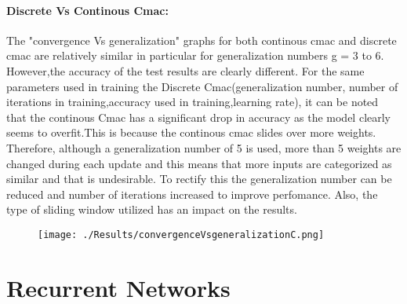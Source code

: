 \documentclass{article}
\begin{document}
  \paragraph{Discrete Vs Continous Cmac:}
  The "convergence Vs generalization" graphs for both continous cmac and discrete cmac are relatively similar in particular for generalization numbers g = 3 to 6. However,the accuracy of the test results  are clearly different.
  For the same parameters used in training the Discrete Cmac(generalization number, number of iterations in training,accuracy used in training,learning rate), it can be noted that the continous Cmac has a significant drop in accuracy as the model clearly seems to overfit.This is because the continous cmac slides over more weights. Therefore, although a generalization number of 5 is used, more than 5 weights are changed during each update and this means that more inputs are categorized as similar and that is undesirable. To rectify this the generalization number can be reduced and number of iterations increased to improve perfomance. Also, the type of sliding window utilized has an impact on the results.  
  \begin{figure}[h!]
    \texttt{[image: ./Results/convergenceVsgeneralizationC.png]}
  \end{figure}
\newpage
\section{Recurrent Networks}
\end{document}
